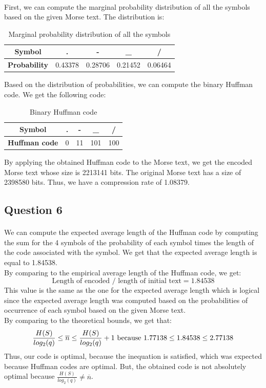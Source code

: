 \documentclass[a4paper, 11pt, oneside]{article}
\begin{document}
\paragraph{}First, we can compute the marginal probability distribution of all the symbols based on the given Morse text. The distribution is:
\begin{table}[H]
    \centering
    \begin{tabular}{|c|c|c|c|c|}
    \hline
    \textbf{Symbol}      & . & - & \_ & / \\ \hline
    \textbf{Probability} & 0.43378 & 0.28706 & 0.21452 & 0.06464 \\ \hline
    \end{tabular}
    \caption{Marginal probability distribution of all the symbols}
\end{table}
Based on the distribution of probabilities, we can compute the binary Huffman code. We get the following code:
\begin{table}[H]
    \centering
    \begin{tabular}{|c|c|c|c|c|}
    \hline
    \textbf{Symbol}      & . & - & \_ & / \\ \hline
    \textbf{Huffman code} & 0 & 11 & 101 & 100 \\ \hline
    \end{tabular}
    \caption{Binary Huffman code}
\end{table}
By applying the obtained Huffman code to the Morse text, we get the encoded Morse text whose size is 2213141 bits. The original Morse text has a size of 2398580 bits. Thus, we have a compression rate of 1.08379.


\subsection{Question 6}
\paragraph{}We can compute the expected average length of the Huffman code by computing the sum for the 4 symbols of the probability of each symbol times the length of the code associated with the symbol.
We get that the expected average length is equal to 1.84538.\\
By comparing to the empirical average length of the Huffman code, we get:
$$\text{Length of encoded } / \text{ length of initial text} = 1.84538$$
This value is the same as the one for the expected average length which is logical since the expected average length was computed based on the probabilities of occurrence of each symbol based on the given Morse text.\\
By comparing to the theoretical bounds, we get that:\\
\begin{equation}
    \frac{H(S)}{log_2(q)} \leq \overline{n} \leq \frac{H(S)}{log_2(q)} + 1$ because $1.77138 \leq 1.84538 \leq 2.77138
\end{equation}
Thus, our code is optimal, because the inequation is satisfied, which was expected because Huffman codes are optimal. But, the obtained code is not absolutely optimal because $\frac{H(S)}{log_2(q)} \neq \overline{n}$.
\end{document}
